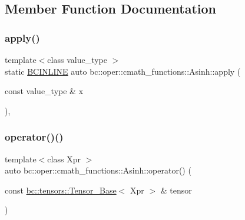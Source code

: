 \subsection{Member Function Documentation}
\mbox{\label{structbc_1_1oper_1_1cmath__functions_1_1Asinh_ab65c46cf8a69539fff1a71b9ec1f4e8a}} 
\subsubsection{\texorpdfstring{apply()}{apply()}}
{\footnotesize\ttfamily template$<$class value\+\_\+type $>$ \\
static \hyperlink{common_8h_a6699e8b0449da5c0fafb878e59c1d4b1}{B\+C\+I\+N\+L\+I\+NE} auto bc\+::oper\+::cmath\+\_\+functions\+::\+Asinh\+::apply (\begin{DoxyParamCaption}\item[{const value\+\_\+type \&}]{x }\end{DoxyParamCaption})\hspace{0.3cm}{\ttfamily [inline]}, {\ttfamily [static]}}

\mbox{\label{structbc_1_1oper_1_1cmath__functions_1_1Asinh_aa88f33581a4f1bc627091ff9e06fbc02}} 
\subsubsection{\texorpdfstring{operator()()}{operator()()}\hspace{0.1cm}{\footnotesize\ttfamily [1/3]}}
{\footnotesize\ttfamily template$<$class Xpr $>$ \\
auto bc\+::oper\+::cmath\+\_\+functions\+::\+Asinh\+::operator() (\begin{DoxyParamCaption}\item[{const \hyperlink{classbc_1_1tensors_1_1Tensor__Base}{bc\+::tensors\+::\+Tensor\+\_\+\+Base}$<$ Xpr $>$ \&}]{tensor }\end{DoxyParamCaption})\hspace{0.3cm}{\ttfamily [inline]}}

